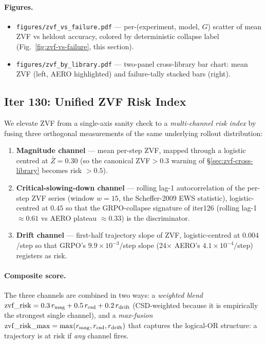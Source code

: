 \paragraph{Figures.}
\begin{itemize}
\item \texttt{figures/zvf_vs_failure.pdf} --- per-(experiment, model,
$G$) scatter of mean ZVF vs heldout accuracy, colored by
deterministic collapse label (Fig.~\ref{fig:zvf-vs-failure}, this
section).
\item \texttt{figures/zvf_by_library.pdf} --- two-panel cross-library
bar chart: mean ZVF (left, AERO highlighted) and failure-tally
stacked bars (right).
\end{itemize}

\subsection{Iter 130: Unified ZVF Risk Index}
\label{sec:zvf-risk-index}
We elevate ZVF from a single-axis sanity check to a \emph{multi-channel
risk index} by fusing three orthogonal measurements of the same
underlying rollout distribution:
\begin{enumerate}
\item \textbf{Magnitude channel} --- mean per-step ZVF, mapped through a
logistic centred at $\bar{Z}{=}0.30$ (so the canonical ZVF${>}0.3$ warning
of \S\ref{sec:zvf-cross-library} becomes risk $>0.5$).
\item \textbf{Critical-slowing-down channel} --- rolling lag-1
autocorrelation of the per-step ZVF series (window $w{=}15$, the
Scheffer-2009 EWS statistic), logistic-centred at $0.45$ so that the
GRPO-collapse signature of iter126 (rolling lag-1 $\approx 0.61$ vs
AERO plateau $\approx 0.33$) is the discriminator.
\item \textbf{Drift channel} --- first-half trajectory slope of ZVF,
logistic-centred at $0.004$/step so that GRPO's $9.9{\times}10^{-3}$/step
slope (24$\times$ AERO's $4.1{\times}10^{-4}$/step) registers as risk.
\end{enumerate}

\paragraph{Composite score.} The three channels are combined in two
ways: a \emph{weighted blend} $\mathrm{zvf\_risk} = 0.3\,r_{\rm mag}
+ 0.5\,r_{\rm csd} + 0.2\,r_{\rm drift}$ (CSD-weighted because it is
empirically the strongest single channel), and a \emph{max-fusion}
$\mathrm{zvf\_risk\_max} = \max(r_{\rm mag}, r_{\rm csd}, r_{\rm drift})$
that captures the logical-OR structure: a trajectory is at risk if
\emph{any} channel fires.

